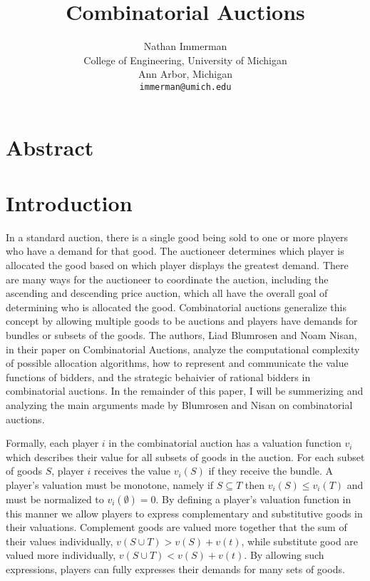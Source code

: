 \documentclass[10pt,onecolumn,letterpaper]{article}
\theoremstyle{definition}
\begin{document}
\title{Combinatorial Auctions}

\author{Nathan Immerman\\
College of Engineering, University of Michigan\\
Ann Arbor, Michigan\\
{\tt\small immerman@umich.edu}
}

\maketitle


\section{Abstract}

\section{Introduction} %

In a standard auction,  there is a single good being sold to one or more players who have a demand for that good. The auctioneer determines which player is allocated the good based on which player displays the greatest demand. There are many ways for the auctioneer to coordinate the auction, including the ascending and descending price auction, which all have the overall goal of determining who is allocated the good. Combinatorial auctions generalize this concept by allowing multiple goods to be auctions and players have demands for bundles or subsets of the goods. The authors, Liad Blumrosen and Noam Nisan, in their paper on Combinatorial Auctions, analyze the computational complexity of possible allocation algorithms, how to represent and communicate the value functions of bidders, and the strategic behaivier of rational bidders in combinatorial auctions. In the remainder of this paper, I will be summerizing and analyzing the main arguments made by Blumrosen and Nisan on combinatorial auctions. 

Formally, each player $i$ in the combinatorial auction has a valuation function $v_i$ which describes their value for all subsets of goods in the auction. For each subset of goods $S$, player $i$ receives the value $v_i(S)$ if they receive the bundle. A player's valuation must be monotone, namely if $S \subseteq T$ then $v_i(S) \leq v_i(T)$ and must be normalized to $v_i(\emptyset)= 0$. By defining a player's valuation function in this manner we allow players to express complementary and substitutive goods in their valuations. Complement goods are valued more together that the sum of their values individually, $v(S \cup T) > v(S) + v(t)$, while substitute good are valued more individually, $v(S \cup T) < v(S) + v(t)$. By allowing such expressions, players can fully expresses their demands for many sets of goods.
\end{document}
